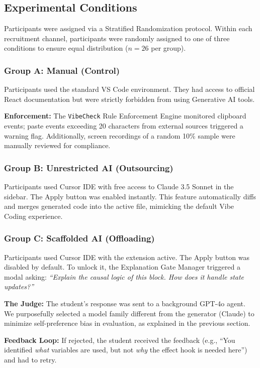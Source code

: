 \documentclass[sigconf]{acmart}
\begin{document}
\subsection{Experimental Conditions}
Participants were assigned via a Stratified Randomization protocol. Within each recruitment channel, participants were randomly assigned to one of three conditions to ensure equal distribution ($n=26$ per group).

\subsubsection{Group A: Manual (Control)}
Participants used the standard VS Code environment. They had access to official React documentation but were strictly forbidden from using Generative AI tools.

\textbf{Enforcement:} The \texttt{VibeCheck} Rule Enforcement Engine monitored clipboard events; paste events exceeding 20 characters from external sources triggered a warning flag. Additionally, screen recordings of a random 10\% sample were manually reviewed for compliance.

\subsubsection{Group B: Unrestricted AI (Outsourcing)}
Participants used Cursor IDE with free access to Claude 3.5 Sonnet in the sidebar. The Apply button was enabled instantly. This feature automatically diffs and merges generated code into the active file, mimicking the default Vibe Coding experience.

\subsubsection{Group C: Scaffolded AI (Offloading)}
Participants used Cursor IDE with the extension active. The Apply button was disabled by default. To unlock it, the Explanation Gate Manager triggered a modal asking: \textit{``Explain the causal logic of this block. How does it handle state updates?''}

\textbf{The Judge:} The student's response was sent to a background GPT-4o agent. We purposefully selected a model family different from the generator (Claude) to minimize self-preference bias in evaluation, as explained in the previous section.

\textbf{Feedback Loop:} If rejected, the student received the feedback (e.g., ``You identified \textit{what} variables are used, but not \textit{why} the effect hook is needed here'') and had to retry.
\end{document}
